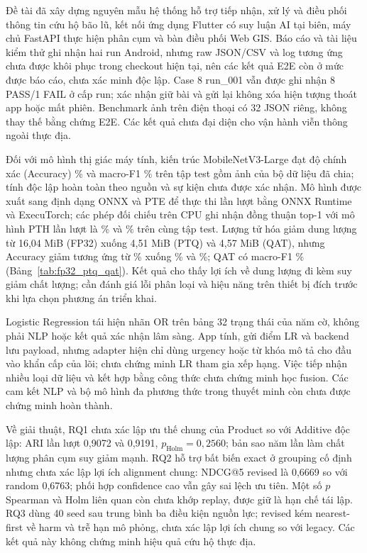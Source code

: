 \label{chap:conclusion}
Đề tài đã xây dựng nguyên mẫu hệ thống hỗ trợ tiếp nhận, xử lý và điều phối thông tin cứu hộ bão lũ, kết nối ứng dụng Flutter có suy luận AI tại biên, máy chủ FastAPI thực hiện phân cụm và bàn điều phối Web GIS. Báo cáo và tài liệu kiểm thử ghi nhận hai run Android, nhưng raw JSON/CSV và log tương ứng chưa được khôi phục trong checkout hiện tại, nên các kết quả E2E còn ở mức được báo cáo, chưa xác minh độc lập. Case 8 run\_001 vẫn được ghi nhận 8 PASS/1 FAIL ở cấp run; xác nhận giữ bài và gửi lại không xóa hiện tượng thoát app hoặc mất phiên. Benchmark ảnh trên điện thoại có 32 JSON riêng, không thay thế bằng chứng E2E. Các kết quả chưa đại diện cho vận hành viễn thông ngoài thực địa.

Đối với mô hình thị giác máy tính, kiến trúc MobileNetV3-Large đạt độ chính xác (Accuracy) \NewImageAccuracy\% và macro-F1 \NewImageMacroFOne\% trên tập test gồm \ImageTest{} ảnh của bộ dữ liệu đã chia; tính độc lập hoàn toàn theo nguồn và sự kiện chưa được xác nhận. Mô hình được xuất sang định dạng ONNX và PTE để thực thi lần lượt bằng ONNX Runtime và ExecuTorch; các phép đối chiếu trên CPU ghi nhận đồng thuận top-1 với mô hình PTH lần lượt là \CpuOnnxAgreement\% và \CpuPteAgreement\% trên cùng tập test. Lượng tử hóa giảm dung lượng từ 16,04 MiB (FP32) xuống 4,51 MiB (PTQ) và 4,57 MiB (QAT), nhưng Accuracy giảm tương ứng từ \NewImageAccuracy\% xuống \PTQAccuracy\% và \QATAccuracy\%; QAT có macro-F1 \QATMacroFOne\% (Bảng~\ref{tab:fp32_ptq_qat}). Kết quả cho thấy lợi ích về dung lượng đi kèm suy giảm chất lượng; cần đánh giá lỗi phân loại và hiệu năng trên thiết bị đích trước khi lựa chọn phương án triển khai.

Logistic Regression tái hiện nhãn OR trên bảng 32 trạng thái của năm cờ, không phải NLP hoặc kết quả xác nhận lâm sàng. App tính, gửi điểm LR và backend lưu payload, nhưng adapter hiện chỉ dùng urgency hoặc từ khóa mô tả cho đầu vào khẩn cấp của lõi; chưa chứng minh LR tham gia xếp hạng. Việc tiếp nhận nhiều loại dữ liệu và kết hợp bằng công thức chưa chứng minh học fusion. Các cam kết NLP và bộ mô hình đa phương thức trong thuyết minh còn chưa được chứng minh hoàn thành.

Về giải thuật, RQ1 chưa xác lập ưu thế chung của Product so với Additive độc lập: ARI lần lượt 0,9072 và 0,9191, $p_{\mathrm{Holm}}=0{,}2560$; bản sao năm lần làm chất lượng phân cụm suy giảm mạnh. RQ2 hỗ trợ bất biến exact ở grouping cố định nhưng chưa xác lập lợi ích alignment chung: NDCG@5 revised là 0,6669 so với random 0,6763; phối hợp confidence cao vẫn gây sai lệch ưu tiên. Một số $p$ Spearman và Holm liên quan còn chưa khớp replay, được giữ là hạn chế tái lập. RQ3 dùng 40 seed sau trung bình ba điều kiện nguồn lực; revised kém nearest-first về harm và trễ hạn mô phỏng, chưa xác lập lợi ích chung so với legacy. Các kết quả này không chứng minh hiệu quả cứu hộ thực địa.


